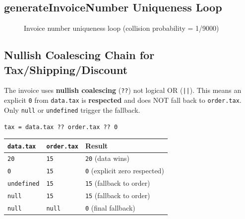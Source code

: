 \documentclass[12pt,a4paper]{report}
\begin{document}
\subsection{generateInvoiceNumber Uniqueness Loop}

\begin{figure}[h!]
\centering
{}
\caption{Invoice number uniqueness loop (collision probability = 1/9000)}
\end{figure}

\subsection{Nullish Coalescing Chain for Tax/Shipping/Discount}

\begin{tcolorbox}[infobox, title={Critical: \texttt{??} vs \texttt{||} Operator}]
The invoice uses \textbf{nullish coalescing} (\texttt{??}) not logical OR (\texttt{||}).
This means an explicit \texttt{0} from \texttt{data.tax} is \textbf{respected} and does NOT
fall back to \texttt{order.tax}. Only \texttt{null} or \texttt{undefined} trigger the fallback.

\medskip
\texttt{tax = data.tax ?? order.tax ?? 0}

\begin{center}
\begin{tabular}{lll}
  \toprule
  \texttt{data.tax} & \texttt{order.tax} & \textbf{Result} \\
  \midrule
  \texttt{20}        & \texttt{15}        & \texttt{20} (data wins) \\
  \texttt{0}         & \texttt{15}        & \texttt{0}  (explicit zero respected) \\
  \texttt{undefined} & \texttt{15}        & \texttt{15} (fallback to order) \\
  \texttt{null}      & \texttt{15}        & \texttt{15} (fallback to order) \\
  \texttt{null}      & \texttt{null}      & \texttt{0}  (final fallback) \\
  \bottomrule
\end{tabular}
\end{center}
\end{tcolorbox}
\end{document}
